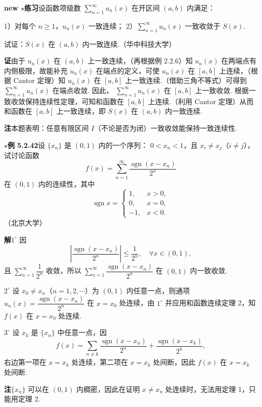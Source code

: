 \documentclass[UTF8, 12pt, fontset=fandol, oneside]{ctexart}
\begin{document}
\noindent\textbf{new $\star$练习}\quad 设函数项级数
$\displaystyle\sum_{n=1}^{\infty}u_n(x)$ 在开区间 $(a,b)$ 内满足：

1）对每个 $n\ge1$，$u_n(x)$ 一致连续；
2）$\displaystyle\sum_{n=1}^{\infty}u_n(x)$ 一致收敛于 $S(x)$.

试证：$S(x)$ 在 $(a,b)$ 内一致连续.（华中科技大学）

\noindent\textbf{证}\quad 由于 $u_n(x)$ 在 $(a,b)$ 上一致连续，（再根据例 2.2.6）知
$u_n(x)$ 在两端点有内侧极限，故能补充 $u_n(x)$ 在端点的定义，可使 $u_n(x)$ 在
$[a,b]$ 上连续，（根据 Cantor 定理）知 $u_n(x)$ 在 $[a,b]$ 上一致连续.（借助三角不等式）可得到
$\displaystyle\sum_{n=1}^{\infty}u_n(x)$ 在端点收敛. 因此，
$\displaystyle\sum_{n=1}^{\infty}u_n(x)$ 在 $[a,b]$ 上一致收敛. 根据一致收敛保持连续性定理，可知和函数在
$[a,b]$ 上连续.（利用 Cantor 定理）从而和函数在 $[a,b]$ 上一致连续，即
$S(x)$ 在 $(a,b)$ 内一致连续.

\noindent\textbf{注}\quad 本题表明：任意有限区间 $I$（不论是否为闭）一致收敛能保持一致连续性.

\noindent\textbf{$\star$例 5.2.42}\quad 设 $\{x_n\}$ 是 $(0,1)$ 内的一个序列：
$0<x_n<1$，且 $x_i\ne x_j$（$i\ne j$），试讨论函数
\[
  f(x)=\sum_{n=1}^{\infty}\frac{\operatorname{sgn}(x-x_n)}{2^n}
\]
在 $(0,1)$ 内的连续性，其中
\[
  \operatorname{sgn}x=
  \begin{cases}
    1,& x>0,\\
    0,& x=0,\\
    -1,& x<0.
  \end{cases}
\]
（北京大学）

\noindent\textbf{解}\quad $1^\circ$ 因
\[
  \left|\frac{\operatorname{sgn}(x-x_n)}{2^n}\right|\le\frac1{2^n},
  \quad \forall x\in(0,1),
\]
且 $\displaystyle\sum_{n=1}^{\infty}\dfrac1{2^n}$ 收敛，所以
$\displaystyle\sum_{n=1}^{\infty}\dfrac{\operatorname{sgn}(x-x_n)}{2^n}$ 在
$(0,1)$ 内一致收敛.

$2^\circ$ 设 $x_0\ne x_n$（$n=1,2,\cdots$）为 $(0,1)$ 内任意一点，则通项
$u_n(x)=\dfrac{\operatorname{sgn}(x-x_n)}{2^n}$ 在 $x=x_0$ 处连续，由
$1^\circ$ 并应用和函数连续定理 2，知 $f(x)$ 在 $x=x_0$ 处连续.

$3^\circ$ 设 $x_k$ 是 $\{x_n\}$ 中任意一点，因
\[
  f(x)=\sum_{n\ne k}\frac{\operatorname{sgn}(x-x_n)}{2^n}
  +\frac{\operatorname{sgn}(x-x_k)}{2^k},
\]
右边第一项在 $x=x_k$ 处连续，第二项在 $x=x_k$ 处间断，因此
$f(x)$ 在 $x=x_k$ 处间断.

\noindent\textbf{注}\quad $\{x_n\}$ 可以在 $(0,1)$ 内稠密，因此在证明 $x\ne x_n$ 处连续时，无法用定理 1，只能用定理 2.
\end{document}
